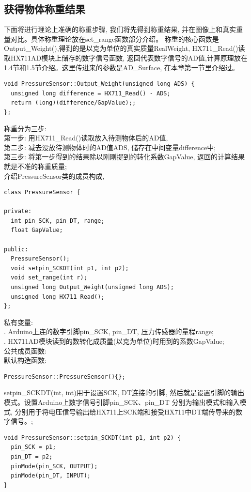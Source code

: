 \documentclass{article}
\begin{document}
\subsection{获得物体称重结果}
下面将进行理论上准确的称重步骤, 我们将先得到称重结果, 并在图像上和真实重量对比。具体称重理论放在set\_range函数部分介绍。
称重的核心函数是Output\_Weight(),得到的是以克为单位的真实质量RealWeight, HX711\_Read()读取HX711AD模块上储存的数字信号函数, 
返回代表数字信号的AD值,计算原理放在1.4节和1.5节介绍。这里传进来的参数是AD\_Surface, 在本章第一节里介绍过。
\begin{lstlisting}
void PressureSensor::Output_Weight(unsigned long ADS) {
  unsigned long difference = HX711_Read() - ADS;
  return (long)(difference/GapValue);;
};
\end{lstlisting}
称重分为三步:\\
\noindent 第一步: 用HX711\_Read()读取放入待测物体后的AD值, \\
\noindent 第二步: 减去没放待测物体时的AD值ADS, 储存在中间变量difference中;\\
\noindent 第三步: 将第一步得到的结果除以刚刚提到的转化系数GapValue, 返回的计算结果就是不准的称重质量;\\

介绍PressureSensor类的成员构成, 
\begin{lstlisting}
class PressureSensor {

private:
  int pin_SCK, pin_DT, range;
  float GapValue;

public:
  PressureSensor();
  void setpin_SCKDT(int p1, int p2);
  void set_range(int r);
  unsigned long Output_Weight(unsigned long ADS);
  unsigned long HX711_Read();
};
\end{lstlisting}

私有变量: \\
.	Arduino上连的数字引脚pin\_SCK, pin\_DT, 压力传感器的量程range;\\
. HX711AD模块读到的数转化成质量(以克为单位)时用到的系数GapValue;\\

公共成员函数: \\
默认构造函数:
\begin{lstlisting}
PressureSensor::PressureSensor(){};
\end{lstlisting}

setpin\_SCKDT(int, int)用于设置SCK, DT连接的引脚, 然后就是设置引脚的输出模式。设置Arduino上数字信号引脚pin\_SCK、pin\_DT
分别为输出模式和输入模式, 分别用于将电压信号输出给HX711上SCK端和接受HX711中DT端传导来的数字信号。;\\
\begin{lstlisting}
void PressureSensor::setpin_SCKDT(int p1, int p2) {
  pin_SCK = p1;
  pin_DT = p2;
  pinMode(pin_SCK, OUTPUT);	
  pinMode(pin_DT, INPUT);	
}
\end{lstlisting}
\end{document}
